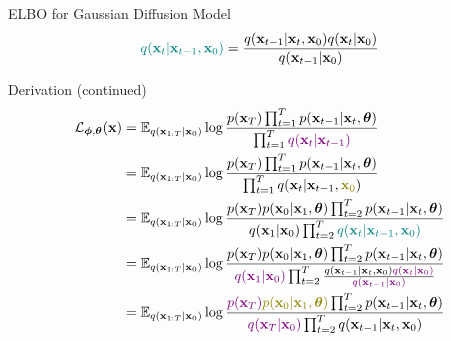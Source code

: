 \documentclass{beamer}
\begin{document}
\begin{frame}{ELBO for Gaussian Diffusion Model}
    \[
         {\color{teal}q(\mathbf{x}_t | \mathbf{x}_{t-1}, \mathbf{x}_0)}  = \frac{q(\mathbf{x}_{t-1}|\mathbf{x}_t, \mathbf{x}_0)q(\mathbf{x}_{t} | \mathbf{x}_0)}{q(\mathbf{x}_{t-1}| \mathbf{x}_0)}
    \]
    \vspace{-0.3cm}
    \begin{block}{Derivation (continued)}
        \vspace{-0.6cm}
        {\small
        \begin{align*}
            \cL_{\bphi, \btheta}(\bx) & = \bbE_{q(\bx_{1:T} | \bx_0)} \log \frac{p(\bx_T) \prod_{t=1}^T p(\bx_{t-1} | \bx_t, \btheta) }{\prod_{t=1}^T {\color{violet}q(\bx_t | \bx_{t-1})}}  \\ 
            & = \bbE_{q(\bx_{1:T} | \bx_0)} \log \frac{p(\bx_T) \prod_{t=1}^T p(\bx_{t-1} | \bx_t, \btheta) }{\prod_{t=1}^T q(\bx_t | \bx_{t-1}, {\color{olive}\bx_0})}  \\ 
            & = \bbE_{q(\bx_{1:T} | \bx_0)} \log \frac{p(\bx_T) p(\bx_0 | \bx_1, \btheta) \prod_{t=2}^T p(\bx_{t-1} | \bx_t, \btheta) }{q(\bx_1 | \bx_0)\prod_{t=2}^T {\color{teal}q(\bx_t | \bx_{t-1}, \bx_0)}} \\
            & = \bbE_{q(\bx_{1:T} | \bx_0)} \log \frac{p(\bx_T) p(\bx_0 | \bx_1, \btheta) \prod_{t=2}^T p(\bx_{t-1} | \bx_t, \btheta) }{{\color{violet}q(\bx_1 | \bx_0)}\prod_{t=2}^T \frac{q(\bx_{t-1}|\bx_t, \bx_0) {\color{violet}q(\bx_{t} | \bx_0)}}{{\color{violet}q(\bx_{t-1}| \bx_0)}}} \\
            & = \bbE_{q(\bx_{1:T} | \bx_0)} \log \frac{{\color{violet}p(\bx_T)} {\color{olive}p(\bx_0 | \bx_1, \btheta)} \prod_{t=2}^T p(\bx_{t-1} | \bx_t, \btheta) }{{\color{violet}q(\bx_T | \bx_0)}\prod_{t=2}^T q(\bx_{t-1}|\bx_t, \bx_0)} 
        \end{align*}}
    \end{block}
\end{frame}
\end{document}
